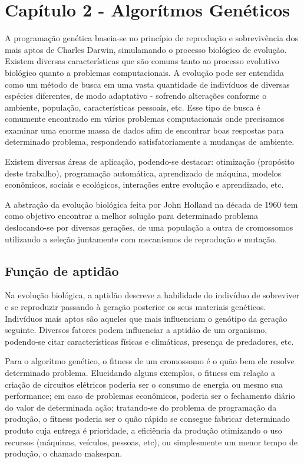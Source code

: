 
\newpage
\section{Capítulo 2 - Algorítmos Genéticos}
A programação genética baseia-se no princípio de reprodução e sobrevivência dos mais aptos de Charles Darwin, simulamando o processo biológico de evolução. Existem diversas características que são comuns tanto ao processo evolutivo biológico quanto a problemas computacionais. A evolução pode ser entendida como um método de busca em uma vasta quantidade de indivíduos de diversas espécies diferentes, de modo adaptativo -  sofrendo alterações conforme o ambiente, população, características pessoais, etc. Esse tipo de busca é comumente encontrado em vários problemas computacionais onde precisamos examinar uma enorme massa de dados afim de encontrar boas respostas para determinado problema, respondendo satisfatoriamente a mudanças de ambiente.

Existem diversas áreas de aplicação, podendo-se destacar: otimização (propósito deste trabalho), programação automática, aprendizado de máquina, modelos econômicos, sociais e ecológicos, interações entre evolução e aprendizado, etc.

A abstração da evolução biológica feita por John Holland na década de 1960 tem como objetivo encontrar a melhor solução para determinado problema  deslocando-se por diversas gerações, de uma população a outra de cromossomos utilizando a seleção juntamente com mecanismos de reprodução e mutação.

\subsection{Função de aptidão}
Na evolução biológica, a aptidão descreve a habilidade do indivíduo de sobreviver e se reproduzir passando à geração posterior os seus materiais genéticos. Indivíduos mais aptos são aqueles que mais influenciam o genótipo da geração seguinte. Diversos fatores podem influenciar a aptidão de um organismo, podendo-se citar características físicas e climáticas, presença de predadores, etc.

Para o algorítmo genético, o fitness de um cromossomo é o quão bem ele resolve determinado problema. Elucidando alguns exemplos, o fitness em relação a criação de circuitos elétricos poderia ser o consumo de energia ou mesmo sua performance; em caso de problemas econômicos, poderia ser o fechamento diário do valor de determinada ação; tratando-se do problema de programação da produção, o fitness poderia ser o quão rápido se consegue fabricar determinado produto cuja entrega é prioridade, a eficiência da produção otimizando o uso recursos (máquinas, veículos, pessoas, etc), ou simplesmente um menor tempo de produção, o chamado makespan.

